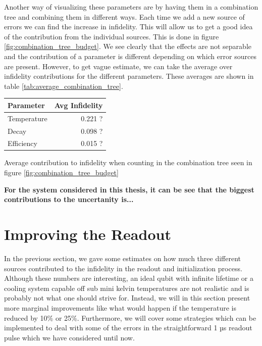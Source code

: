 Another way of visualizing these parameters are by having them in a combination tree and combining them in different ways. Each time we add a new source of errors we can find the increase in infidelity. This will allow us to get a good idea of the contribution from the individual sources. This is done in figure \ref{fig:combination_tree_budget}. We see clearly that the effects are not separable and the contribution of a parameter is different depending on which error sources are present. However, to get vague estimate, we can take the average over infidelity contributions for the different parameters. These averages are shown in table \ref{tab:average_combination_tree}. 
\begin{margintable}
    \centering
    \begin{tabular}{l|r}
    \hline
    Parameter       &  Avg Infidelity\\ \hline
    Temperature     & 0.221 ? \\
    Decay           & 0.098 ? \\
    Efficiency      & 0.015 ? \\
    \end{tabular}
    \caption{Average contribution to infidelity when counting in the combination tree seen in figure \ref{fig:combination_tree_budget}}
    \label{tab:average_combination_tree}
\end{margintable}

\textbf{For the system considered in this thesis, it can be see that the biggest contributions to the uncertanity is... }





\section{Improving the Readout}
In the previous section, we gave some estimates on how much three different sources contributed to the infidelity in the readout and initialization process. Although these numbers are interesting, an ideal qubit with infinite lifetime or a cooling system capable off sub mini kelvin temperatures are not realistic and is probably not what one should strive for. Instead, we will in this section present more marginal improvements like what would happen if the temperature is reduced by 10\% or 25\%. Furthermore, we will cover some strategies which can be implemented to deal with some of the errors in the straightforward 1 µs readout pulse which we have considered until now.

